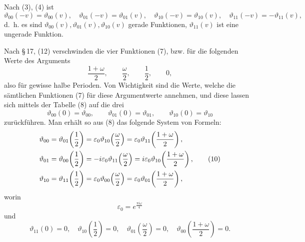 \documentclass[11pt]{article}
\providecommand{\eps}{\varepsilon}
\begin{document}
Nach (3), (4) ist
\begin{equation}
\vartheta_{00}(-v)=\vartheta_{00}(v),\quad
\vartheta_{01}(-v)=\vartheta_{01}(v),\quad
\vartheta_{10}(-v)=\vartheta_{10}(v),\quad
\vartheta_{11}(-v)=-\vartheta_{11}(v),
\tag{9}
\end{equation}
d.\ h. es sind $\vartheta_{00}(v),\vartheta_{01}(v),\vartheta_{10}(v)$ gerade Funktionen, $\vartheta_{11}(v)$ ist eine ungerade Funktion.

Nach \S\,17, (12) verschwinden die vier Funktionen (7), bzw. für die folgenden Werte des Arguments
\[
\frac{1+\omega}{2},\qquad \frac{\omega}{2},\qquad \frac12,\qquad 0,
\]
also für gewisse halbe Perioden. Von Wichtigkeit sind die Werte, welche die sämtlichen Funktionen (7) für diese Argumentwerte annehmen, und diese lassen sich mittels der Tabelle (8) auf die drei
\[
\vartheta_{00}(0)=\vartheta_{00},\qquad
\vartheta_{01}(0)=\vartheta_{01},\qquad
\vartheta_{10}(0)=\vartheta_{10}
\]
zurückführen. Man erhält so aus (8) das folgende System von Formeln:
\begin{align}
\vartheta_{00}&=\vartheta_{01}\!\left(\frac12\right)=\eps_0\vartheta_{10}\!\left(\frac{\omega}{2}\right)=\eps_0\vartheta_{11}\!\left(\frac{1+\omega}{2}\right),\notag\\
\vartheta_{01}&=\vartheta_{00}\!\left(\frac12\right)=-i\eps_0\vartheta_{11}\!\left(\frac{\omega}{2}\right)=i\eps_0\vartheta_{10}\!\left(\frac{1+\omega}{2}\right),\tag{10}\\
\vartheta_{10}&=\vartheta_{11}\!\left(\frac12\right)=\eps_0\vartheta_{00}\!\left(\frac{\omega}{2}\right)=\eps_0\vartheta_{01}\!\left(\frac{1+\omega}{2}\right),
\notag
\end{align}
worin
\[
\eps_0=e^{\frac{\pi i\omega}{4}}
\]
und
\begin{equation}
\vartheta_{11}(0)=0,\quad
\vartheta_{10}\!\left(\frac12\right)=0,\quad
\vartheta_{01}\!\left(\frac{\omega}{2}\right)=0,\quad
\vartheta_{00}\!\left(\frac{1+\omega}{2}\right)=0.
\tag{11}
\end{equation}
\end{document}
